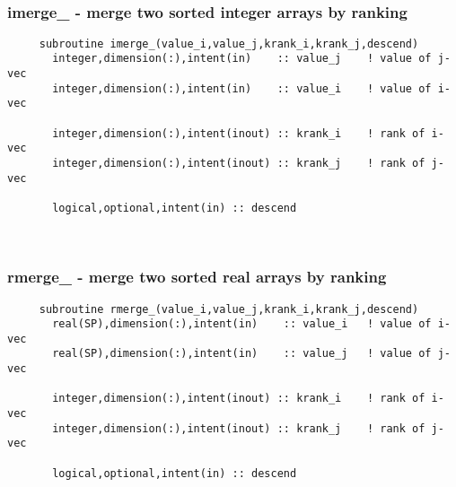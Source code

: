 \mbox{}\hrulefill\ 

  \subsubsection{imerge\_ - merge two sorted integer arrays by ranking}

\begin{verbatim} 
     subroutine imerge_(value_i,value_j,krank_i,krank_j,descend)
       integer,dimension(:),intent(in)    :: value_j	! value of j-vec
       integer,dimension(:),intent(in)    :: value_i	! value of i-vec
 
       integer,dimension(:),intent(inout) :: krank_i	! rank of i-vec
       integer,dimension(:),intent(inout) :: krank_j	! rank of j-vec
 
       logical,optional,intent(in) :: descend
 \end{verbatim}%
 
 
\mbox{}\hrulefill\ 
 
  \subsubsection{rmerge\_ - merge two sorted real arrays by ranking}

\begin{verbatim} 
     subroutine rmerge_(value_i,value_j,krank_i,krank_j,descend)
       real(SP),dimension(:),intent(in)    :: value_i	! value of i-vec
       real(SP),dimension(:),intent(in)    :: value_j	! value of j-vec
 
       integer,dimension(:),intent(inout) :: krank_i	! rank of i-vec
       integer,dimension(:),intent(inout) :: krank_j	! rank of j-vec
 
       logical,optional,intent(in) :: descend
 \end{verbatim}%
 
 

